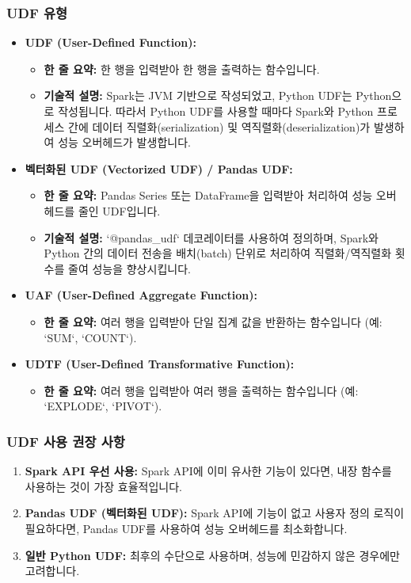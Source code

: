 \documentclass[11pt,a4paper]{article}
\begin{document}
\subsubsection{UDF 유형}
\begin{itemize}
    \item \textbf{UDF (User-Defined Function):}
    \begin{itemize}
        \item \textbf{한 줄 요약:} 한 행을 입력받아 한 행을 출력하는 함수입니다.
        \item \textbf{기술적 설명:} Spark는 JVM 기반으로 작성되었고, Python UDF는 Python으로 작성됩니다. 따라서 Python UDF를 사용할 때마다 Spark와 Python 프로세스 간에 데이터 직렬화(serialization) 및 역직렬화(deserialization)가 발생하여 성능 오버헤드가 발생합니다.
    \end{itemize}
    \item \textbf{벡터화된 UDF (Vectorized UDF) / Pandas UDF:}
    \begin{itemize}
        \item \textbf{한 줄 요약:} Pandas Series 또는 DataFrame을 입력받아 처리하여 성능 오버헤드를 줄인 UDF입니다.
        \item \textbf{기술적 설명:} `@pandas_udf` 데코레이터를 사용하여 정의하며, Spark와 Python 간의 데이터 전송을 배치(batch) 단위로 처리하여 직렬화/역직렬화 횟수를 줄여 성능을 향상시킵니다.
    \end{itemize}
    \item \textbf{UAF (User-Defined Aggregate Function):}
    \begin{itemize}
        \item \textbf{한 줄 요약:} 여러 행을 입력받아 단일 집계 값을 반환하는 함수입니다 (예: `SUM`, `COUNT`).
    \end{itemize}
    \item \textbf{UDTF (User-Defined Transformative Function):}
    \begin{itemize}
        \item \textbf{한 줄 요약:} 여러 행을 입력받아 여러 행을 출력하는 함수입니다 (예: `EXPLODE`, `PIVOT`).
    \end{itemize}
\end{itemize}

\subsubsection{UDF 사용 권장 사항}
\begin{enumerate}
    \item \textbf{Spark API 우선 사용:} Spark API에 이미 유사한 기능이 있다면, 내장 함수를 사용하는 것이 가장 효율적입니다.
    \item \textbf{Pandas UDF (벡터화된 UDF):} Spark API에 기능이 없고 사용자 정의 로직이 필요하다면, Pandas UDF를 사용하여 성능 오버헤드를 최소화합니다.
    \item \textbf{일반 Python UDF:} 최후의 수단으로 사용하며, 성능에 민감하지 않은 경우에만 고려합니다.
\end{enumerate}
\end{document}
